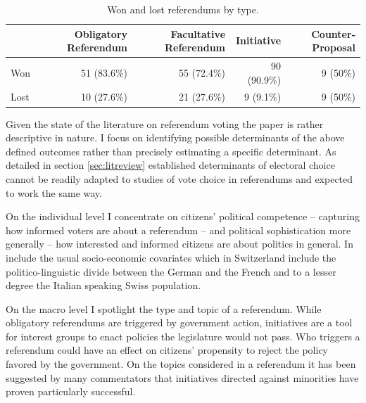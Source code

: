 \documentclass[11pt,a4paper]{article}\usepackage[]{graphicx}\usepackage[]{color}
\begin{document}
    \begin{table}[htb]
    \tiny\centering
      \begin{tabular}{lrrrr}
      \toprule
        & Obligatory Referendum & Facultative Referendum & Initiative & Counter-Proposal \\
      \midrule  
      Won & 51 (83.6\%) & 55 (72.4\%) & 90 (90.9\%) & 9 (50\%) \\
      Lost & 10 (27.6\%) & 21 (27.6\%) & 9 (9.1\%) & 9 (50\%) \\
      \bottomrule
      \end{tabular}
      
      \caption{Won and lost referendums by type.}
      
    \end{table}
    
    Given the state of the literature on referendum voting the paper is rather descriptive in nature. I focus on identifying possible determinants of the above defined outcomes rather than precisely estimating a specific determinant. As detailed in section \ref{sec:litreview} established determinants of electoral choice cannot be readily adapted to studies of vote choice in referendums and expected to work the same way. 
    
    On the individual level I concentrate on citizens' political competence -- capturing how informed voters are about a referendum -- and political sophistication more generally -- how interested and informed citizens are about politics in general. In include the usual socio-economic covariates which in Switzerland include the politico-linguistic divide between the German and the French and to a lesser degree the Italian speaking Swiss population. 
    
    On the macro level I spotlight the type and topic of a referendum. %
    While obligatory referendums are triggered by government action, initiatives are a tool for interest groups to enact policies the legislature would not pass. Who triggers a referendum could have an effect on citizens' propensity to reject the policy favored by the government. On the topics considered in a referendum it has been suggested by many commentators that initiatives directed against minorities have proven particularly successful. %
    
\end{document}
